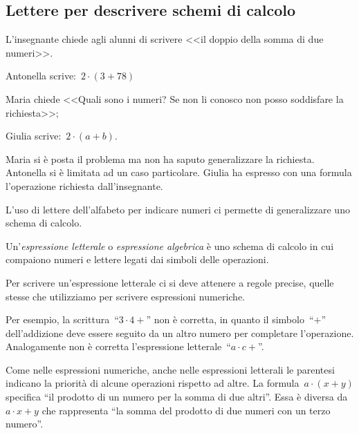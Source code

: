 
\subsection{Lettere per descrivere schemi di calcolo}
\begin{exrig}
 \begin{esempio}
 L'insegnante chiede agli alunni di scrivere 
 <<il doppio della somma di due numeri>>.

\begin{itemize*}
\item Antonella scrive:~$2\cdot (3+78)$
\item Maria chiede <<Quali sono i numeri? Se non li conosco non posso 
  soddisfare la richiesta>>;
\item Giulia scrive:~$2\cdot (a+b)$.
\end{itemize*}
Maria si è posta il problema ma non ha saputo generalizzare la richiesta. 
Antonella si è limitata ad un caso particolare. 
Giulia ha espresso con una formula l'operazione richiesta dall'insegnante.
 \end{esempio}
\end{exrig}

\osservazione L'uso di lettere dell'alfabeto per indicare numeri ci permette 
di generalizzare uno schema di calcolo.

\begin{definizione}
 Un'\emph{espressione letterale} o \emph{espressione algebrica} è uno schema 
 di calcolo in cui compaiono numeri e lettere legati dai simboli delle 
 operazioni.
\end{definizione}

Per scrivere un'espressione letterale ci si deve attenere a regole precise, 
quelle stesse che utilizziamo per scrivere espressioni numeriche.

Per esempio, la scrittura~``$3\cdot 4+$'' non è corretta, in quanto il 
simbolo~``$+$'' dell'addizione deve essere seguito da un altro numero per 
completare l'operazione. Analogamente non è corretta l'espressione 
letterale~``$a\cdot c+$''.

Come nelle espressioni numeriche, anche nelle espressioni letterali le 
parentesi indicano la priorità di alcune operazioni rispetto ad altre.
La formula~$a\cdot (x+y)$ specifica ``il prodotto di un numero per la somma di 
due altri''. Essa è diversa da  $a\cdot x+y$
che rappresenta ``la somma del prodotto di due numeri con un terzo numero''.

